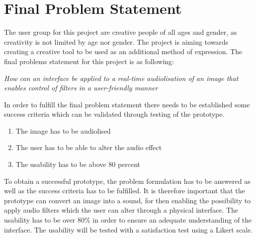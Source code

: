 \chapter{Final Problem Statement}\label{ch:finalproblem}

The user group for this project are creative people of all ages and gender, as creativity is not limited by age nor gender. The project is aiming towards creating a creative tool to be used as an additional method of expression. 
The final problems statement for this project is as following:



\textit{How can an interface be applied to a real-time audiolisation of an image that enables control of filters in a user-friendly manner}



In order to fulfill the final problem statement there needs to be established some success criteria which can be validated through testing of the prototype. 
\begin{enumerate}
\item The image has to be audiolised 
\item The user has to be able to alter the audio effect 
\item The usability has to be above 80 percent
\end{enumerate}

To obtain a successful prototype, the problem formulation has to be answered as well as the success criteria has to be fulfilled. It is therefore important that the prototype can convert an image into a sound, for then enabling the possibility to apply audio filters which the user can alter through a physical interface. The usability has to be over 80\% in order to ensure an adequate understanding of the interface. The usability will be tested with a satisfaction test using a Likert scale.